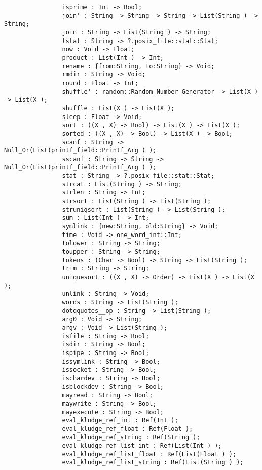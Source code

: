 \begin{verbatim}
                isprime : Int -> Bool;
                join' : String -> String -> String -> List(String ) -> String;
                join : String -> List(String ) -> String;
                lstat : String -> ?.posix_file::stat::Stat;
                now : Void -> Float;
                product : List(Int ) -> Int;
                rename : {from:String, to:String} -> Void;
                rmdir : String -> Void;
                round : Float -> Int;
                shuffle' : random::Random_Number_Generator -> List(X ) -> List(X );
                shuffle : List(X ) -> List(X );
                sleep : Float -> Void;
                sort : ((X , X) -> Bool) -> List(X ) -> List(X );
                sorted : ((X , X) -> Bool) -> List(X ) -> Bool;
                scanf : String -> Null_Or(List(printf_field::Printf_Arg ) );
                sscanf : String -> String -> Null_Or(List(printf_field::Printf_Arg ) );
                stat : String -> ?.posix_file::stat::Stat;
                strcat : List(String ) -> String;
                strlen : String -> Int;
                strsort : List(String ) -> List(String );
                struniqsort : List(String ) -> List(String );
                sum : List(Int ) -> Int;
                symlink : {new:String, old:String} -> Void;
                time : Void -> one_word_int::Int;
                tolower : String -> String;
                toupper : String -> String;
                tokens : (Char -> Bool) -> String -> List(String );
                trim : String -> String;
                uniquesort : ((X , X) -> Order) -> List(X ) -> List(X );
                unlink : String -> Void;
                words : String -> List(String );
                dotqquotes__op : String -> List(String );
                arg0 : Void -> String;
                argv : Void -> List(String );
                isfile : String -> Bool;
                isdir : String -> Bool;
                ispipe : String -> Bool;
                issymlink : String -> Bool;
                issocket : String -> Bool;
                ischardev : String -> Bool;
                isblockdev : String -> Bool;
                mayread : String -> Bool;
                maywrite : String -> Bool;
                mayexecute : String -> Bool;
                eval_kludge_ref_int : Ref(Int );
                eval_kludge_ref_float : Ref(Float );
                eval_kludge_ref_string : Ref(String );
                eval_kludge_ref_list_int : Ref(List(Int ) );
                eval_kludge_ref_list_float : Ref(List(Float ) );
                eval_kludge_ref_list_string : Ref(List(String ) );

\end{verbatim}
